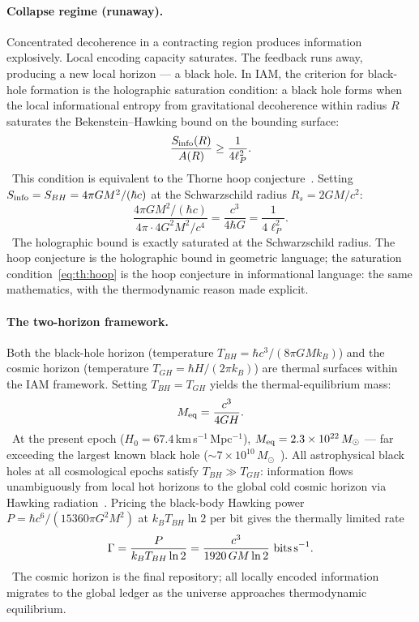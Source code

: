 \paragraph{Collapse regime (runaway).} Concentrated decoherence in a contracting region produces information explosively. Local encoding capacity
saturates. The feedback runs away, producing a new local horizon --- a black hole. In IAM, the criterion for black-hole formation is the holographic
saturation condition: a black hole forms when the local informational entropy from gravitational decoherence within radius $R$ saturates the
Bekenstein--Hawking bound on the bounding surface:
\begin{equation}\frac{S_{\rm info}(R)}{A(R)}\ge\frac{1}{4\ell_P^2}.\label{eq:th:hoop}\end{equation}
\conjecture\ This condition is equivalent to the Thorne hoop conjecture~\cite{Thorne1972}. Setting $S_{\rm info}=S_{BH}=4\pi GM^2/(\hbar c)$ at the
Schwarzschild radius $R_s=2GM/c^2$:
\begin{equation}\frac{4\pi GM^2/(\hbar c)}{4\pi\cdot4G^2M^2/c^4}=\frac{c^3}{4\hbar G}=\frac{1}{4\ell_P^2}.\label{eq:th:hoopcheck}\end{equation}
\derived\ The holographic bound is exactly saturated at the Schwarzschild radius. The hoop conjecture is the holographic bound in geometric language; the
saturation condition~\eqref{eq:th:hoop} is the hoop conjecture in informational language: the same mathematics, with the thermodynamic reason made explicit.
\interp

\paragraph{The two-horizon framework.} Both the black-hole horizon (temperature $T_{BH}=\hbar c^3/(8\pi GMk_B)$) and the cosmic horizon (temperature
$T_{GH}=\hbar H/(2\pi k_B)$) are thermal surfaces within the IAM framework. Setting $T_{BH}=T_{GH}$ yields the thermal-equilibrium mass:
\begin{equation}M_{\rm eq}=\frac{c^3}{4GH}.\label{eq:th:Meq}\end{equation}
\derived\ At the present epoch ($H_0=67.4$\,km\,s$^{-1}$\,Mpc$^{-1}$), $M_{\rm eq}=2.3\times10^{22}\,M_\odot$ \calc --- far exceeding the largest known black hole
($\sim7\times10^{10}\,M_\odot$~\cite{Shemmer2004}). All astrophysical black holes at all cosmological epochs satisfy $T_{BH}\gg T_{GH}$: information flows
unambiguously from local hot horizons to the global cold cosmic horizon via Hawking radiation~\cite{Hawking1975}. Pricing the black-body Hawking power
$P=\hbar c^6/(15360\pi G^2M^2)$ at $k_BT_{BH}\ln2$ per bit gives the thermally limited rate
\begin{equation}\Gamma=\frac{P}{k_BT_{BH}\ln2}=\frac{c^3}{1920\,GM\ln2}\ \text{bits\,s}^{-1}.\label{eq:th:Gamma}\end{equation}
\derived\ The cosmic horizon is the final repository; all locally encoded information migrates to the global ledger as the universe approaches
thermodynamic equilibrium. \interp

